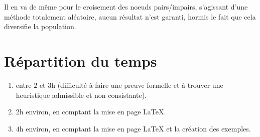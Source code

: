 \documentclass{article}
\begin{document}
\begin{sffamily}
\begin{enumerate}
Il en va de même pour le croisement des noeuds pairs/impairs, s'agissant d'une méthode totalement aléatoire, aucun résultat n'est 
garanti, hormis le fait que cela diversifie la population.

\end{enumerate}

\section{Répartition du temps}

\begin{enumerate}
\item entre $2$ et $3$h (difficulté à faire une preuve formelle et à trouver une heuristique admissible et non consistante).
\item $2$h environ, en comptant la mise en page LaTeX.
\item $4$h environ, en comptant la mise en page LaTeX et la création des exemples.
\end{enumerate}

\end{sffamily}
\end{document}
